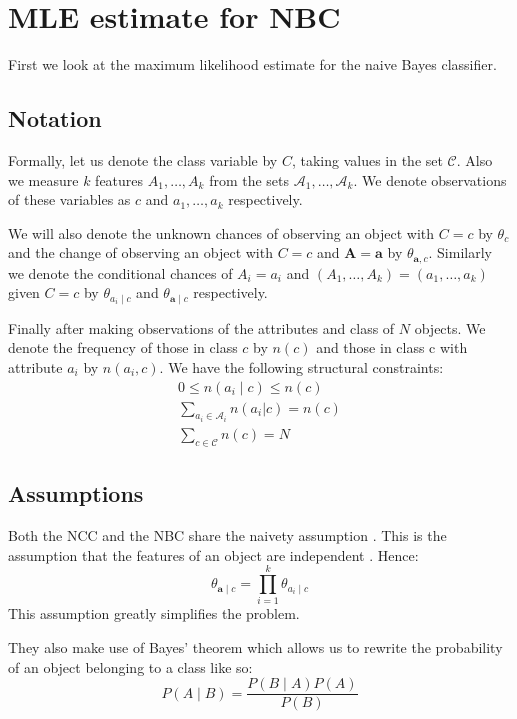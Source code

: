 \chapter{MLE estimate for NBC}

First we look at the maximum likelihood estimate for the naive Bayes classifier.

\section{Notation}

Formally, let us denote the class variable by $C$, taking values in the set $\mathcal{C}$. Also we measure $k$ features $A_1,\dots,A_k$ from the sets $\mathcal{A}_1,\dots,\mathcal{A}_k$. We denote observations of these variables as $c$ and $a_1,\dots,a_k$ respectively.

We will also denote the unknown chances of observing an object with $C=c$ by $\theta_c$ and the change of observing an object with $C=c$ and $\mathbf{A} = \mathbf{a}$ by $\theta_{\mathbf{a}, c}$. Similarly we denote the conditional chances of $A_i=a_i$ and $(A_1,\dots,A_k)=(a_1,\dots,a_k)$ given $C=c$ by $\theta_{a_i \mid c}$ and $\theta_{\mathbf{a} \mid c}$ respectively.

Finally after making observations of the attributes and class of $N$ objects. We denote the frequency of those in class $c$ by $n(c)$ and those in class c with attribute $a_i$ by $n(a_i, c)$. We have the following structural constraints:
\begin{gather}
	0 \leq n(a_i \mid c) \leq n(c) \\
	\sum_{a_i \in \mathcal{A}_i} n(a_i | c) = n(c) \\
	\sum_{c \in \mathcal{C}} n(c) = N
\end{gather}
\section{Assumptions}

Both the NCC and the NBC share the naivety assumption \cite{Zaffalon01}. This is the assumption that the features of an object are independent \cite{Rish01}. Hence:
\begin{equation} \label{naive_assumption}
	\theta_{\mathbf{a} \mid c} = \prod_{i=1}^{k} \theta_{a_i \mid c}
\end{equation}
This assumption greatly simplifies the problem.

They also make use of Bayes' theorem which allows us to rewrite the probability of an object belonging to a class like so:
\begin{equation} \label{bayes_theorem}
    P(A \mid B) = \frac{P(B \mid A) P(A)}{P(B)}
\end{equation}

